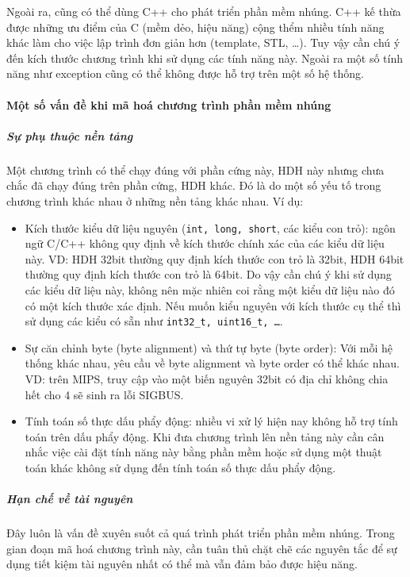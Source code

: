             Ngoài ra, cũng có thể dùng C++ cho phát triển phần mềm nhúng. C++
            kế thừa được những ưu điểm của C (mềm dẻo, hiệu năng) cộng thểm
            nhiều tính năng khác làm cho việc lập trình đơn giản hơn (template,
            STL, \ldots). Tuy vậy cần chú ý đến kích thước chương trình khi sử
            dụng các tính năng này. Ngoài ra một số tính năng như exception
            cũng có thể không được hỗ trợ trên một số hệ thống.

        \paragraph{Một số vấn đề khi mã hoá chương trình phần mềm nhúng}
            \subparagraph{Sự phụ thuộc nền tảng}
                Một chương trình có thể chạy đúng với phần cứng này, HDH này
                nhưng chưa chắc đã chạy đúng trên phần cứng, HDH khác. Đó là do
                một số yếu tố trong chương trình khác nhau ở những nền tảng
                khác nhau. Ví dụ:
                \begin{itemize}
                    \item Kích thước kiểu dữ liệu nguyên (\texttt{int, long,
                        short}, các
                        kiểu con trỏ): ngôn ngữ C/C++ không quy định về kích
                        thước chính xác của các kiểu dữ liệu này. VD: HDH 32bit
                        thường quy định kích thước con trỏ là 32bit, HDH 64bit
                        thường quy định kích thước con trỏ là 64bit. Do vậy cần
                        chú ý khi sử dụng các kiểu dữ liệu này, không nên mặc
                        nhiên coi rằng một kiểu dữ liệu nào đó có một kích
                        thước xác định. Nếu muốn kiểu nguyên với kích thước cụ
                        thể thì sử dụng các kiểu có sẵn như \texttt{int32\_t,
                        uint16\_t, \ldots}.
                    \item Sự căn chỉnh byte (byte alignment) và thứ tự byte
                        (byte order): Với mỗi hệ thống khác nhau, yêu cầu về
                        byte alignment và byte order có thể khác nhau. VD: trên
                        MIPS, truy cập vào một biến nguyên 32bit có địa chỉ
                        không chia hết cho 4 sẽ sinh ra lỗi SIGBUS.
                    \item Tính toán số thực dấu phẩy động: nhiều vi xử lý hiện nay
                        không hỗ trợ tính toán trên dấu phẩy động. Khi đưa
                        chương trình lên nền tảng này cần cân nhắc việc cài đặt
                        tính năng này bằng phần mềm hoặc sử dụng một thuật toán
                        khác không sử dụng đến tính toán số thực dấu phẩy động.
                \end{itemize}
            \subparagraph{Hạn chế về tài nguyên}
                Đây luôn là vấn đề xuyên suốt cả quá trình phát triển phần mềm
                nhúng. Trong gian đoạn mã hoá chương trình này, cần tuân thủ
                chặt chẽ các nguyên tắc để sự dụng tiết kiệm tài nguyên nhất có
                thể mà vẫn đảm bảo được hiệu năng.

